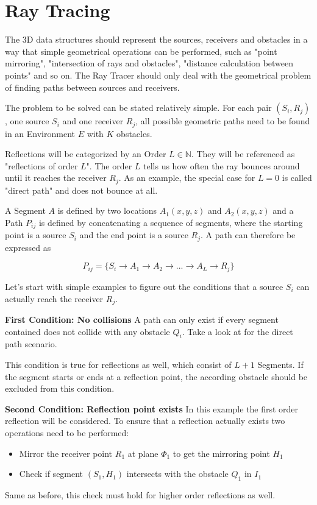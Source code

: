 

\section{Ray Tracing}
The 3D data structures should represent the sources, receivers and obstacles in a way that simple geometrical operations can be performed, such as "point mirroring", "intersection of rays and obstacles", "distance calculation between points" and so on.
The Ray Tracer should only deal with the geometrical problem of finding paths between sources and receivers.

The problem to be solved can be stated relatively simple.
For each pair $(S_i, R_j)$, one source $S_i$ and one receiver $R_j$, all possible geometric paths need to be found in an Environment $E$ with $K$ obstacles.

Reflections will be categorized by an Order $L \in \mathbb{N}$. 
They will be referenced as "reflections of order $L$".
The order $L$ tells us how often the ray bounces around until it reaches the receiver $R_j$.
As an example, the special case for $L=0$ is called "direct path" and does not bounce at all.

A Segment $A$ is defined by two locations $A_1(x,y,z)$ and $A_2(x,y,z)$ and a Path $P_{ij}$ is defined by concatenating a sequence of segments, where the starting point is a source $S_i$ and the end point is a source $R_j$. A path can therefore be expressed as

\begin{equation}
    P_{ij} = \{ S_i \rightarrow A_1 \rightarrow A_2 \rightarrow ... \rightarrow A_L \rightarrow R_j\} 
\end{equation}

Let's start with simple examples to figure out the conditions that a source $S_i$ can actually reach the receiver $R_j$.

\textbf{First Condition: No collisions}\newline
A path can only exist if every segment contained does not collide with any obstacle $Q_i$.
Take a look at  for the direct path scenario.

This condition is true for reflections as well, which consist of $L+1$ Segments.
If the segment starts or ends at a reflection point, the according obstacle should be excluded from this condition.

\textbf{Second Condition: Reflection point exists}\newline
In this example the first order reflection will be considered. 
To ensure that a reflection actually exists two operations need to be performed:
\begin{itemize}
    \item Mirror the receiver point $R_1$ at plane $\Phi_1$ to get the mirroring point $H_1$
    \item Check if segment $(S_1, H_1)$ intersects with the obstacle $Q_1$ in $I_1$
\end{itemize}

Same as before, this check must hold for higher order reflections as well.

